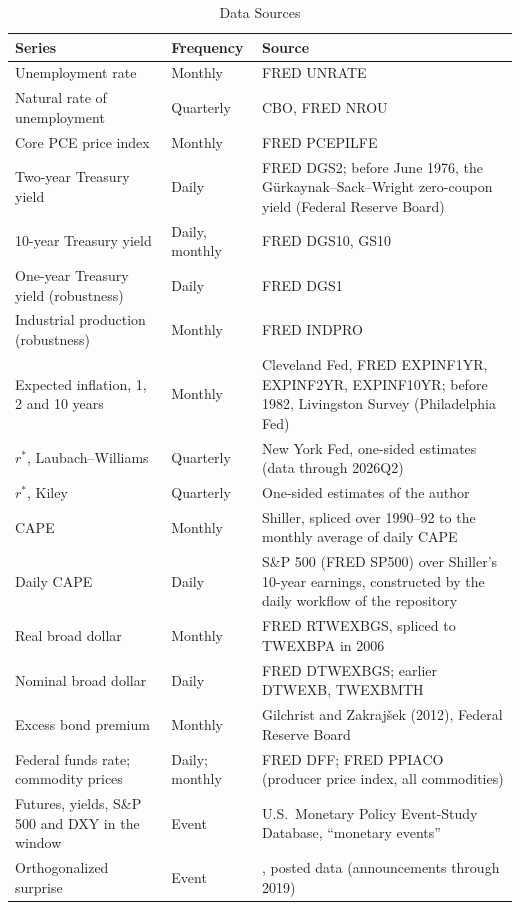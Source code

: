 \documentclass[11pt]{article}
\newcommand{\rs}{r^{*}}
\begin{document}
\begin{appendices}
\begin{table}[tp]\centering\small
\caption{Data Sources}\label{tab:data}
\begin{tabular}{p{}p{}p{}}\toprule
Series & Frequency & Source \\\midrule
Unemployment rate & Monthly & FRED UNRATE \\
Natural rate of unemployment & Quarterly & CBO, FRED NROU \\
Core PCE price index & Monthly & FRED PCEPILFE \\
Two-year Treasury yield & Daily & FRED DGS2; before June 1976, the Gürkaynak--Sack--Wright zero-coupon yield \citep{gurkaynak2007} (Federal Reserve Board) \\
10-year Treasury yield & Daily, monthly & FRED DGS10, GS10 \\
One-year Treasury yield (robustness) & Daily & FRED DGS1 \\
Industrial production (robustness) & Monthly & FRED INDPRO \\
Expected inflation, 1, 2 and 10 years & Monthly & Cleveland Fed, FRED EXPINF1YR, EXPINF2YR, EXPINF10YR; before 1982, Livingston Survey (Philadelphia Fed) \\
$\rs$, Laubach--Williams & Quarterly & New York Fed, one-sided estimates (data through 2026Q2) \\
$\rs$, Kiley & Quarterly & One-sided estimates of the author \\
CAPE & Monthly & Shiller, spliced over 1990--92 to the monthly average of daily CAPE \\
Daily CAPE & Daily & S\&P 500 (FRED SP500) over Shiller's 10-year earnings, constructed by the daily workflow of the repository \\
Real broad dollar & Monthly & FRED RTWEXBGS, spliced to TWEXBPA in 2006 \\
Nominal broad dollar & Daily & FRED DTWEXBGS; earlier DTWEXB, TWEXBMTH \\
Excess bond premium & Monthly & Gilchrist and Zakrajšek (2012), Federal Reserve Board \\
Federal funds rate; commodity prices & Daily; monthly & FRED DFF; FRED PPIACO (producer price index, all commodities) \\
Futures, yields, S\&P 500 and DXY in the window & Event & U.S.\ Monetary Policy Event-Study Database, ``monetary events'' \citep{acosta2025} \\
Orthogonalized surprise & Event & \citet{bauer2023}, posted data (announcements through 2019) \\
\end{tabular}
\end{table}

\end{appendices}
\end{document}
